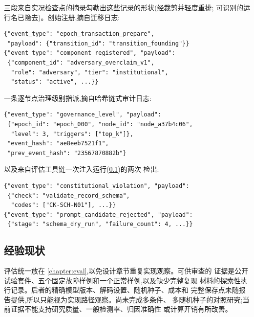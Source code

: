三段来自实况检查点的摘录勾勒出这些记录的形状(经裁剪并轻度重排;
可识别的运行名已隐去)。创始注册,摘自迁移日志:

\begin{Verbatim}[breaklines, fontsize=\scriptsize]
{"event_type": "epoch_transaction_prepare",
 "payload": {"transition_id": "transition_founding"}}
{"event_type": "component_registered", "payload":
 {"component_id": "adversary_overclaim_v1",
  "role": "adversary", "tier": "institutional",
  "status": "active", ...}}
\end{Verbatim}

\noindent
一条逐节点治理级别指派,摘自哈希链式审计日志:

\begin{Verbatim}[breaklines, fontsize=\scriptsize]
{"event_type": "governance_level", "payload":
 {"epoch_id": "epoch_000", "node_id": "node_a37b4c06",
  "level": 3, "triggers": ["top_k"]},
 "event_hash": "ae8eeb7521f1",
 "prev_event_hash": "23567870882b"}
\end{Verbatim}

\noindent
以及来自评估工具链一次注入运行(\cref{sec:rqgm:empirical})的两次
检出:

\begin{Verbatim}[breaklines, fontsize=\scriptsize]
{"event_type": "constitutional_violation", "payload":
 {"check": "validate_record_schema",
  "codes": ["CK-SCH-N01"], ...}}
{"event_type": "prompt_candidate_rejected", "payload":
 {"stage": "schema_dry_run", "failure_count": 4, ...}}
\end{Verbatim}

\subsection{经验现状}\label{sec:rqgm:empirical}

评估统一放在 \cref{chapter:eval},以免设计章节重复实现观察。可供审查的
证据是公开试验套件、五个固定故障样例和一个正常样例,以及缺少完整复现
材料的探索性执行记录。后者的精确模型版本、解码设置、随机种子、成本和
完整保存点未随报告提供,所以只能视为实现路径观察。尚未完成多条件、
多随机种子的对照研究;当前证据不能支持研究质量、一般检测率、归因准确性
或计算开销有所改善。
